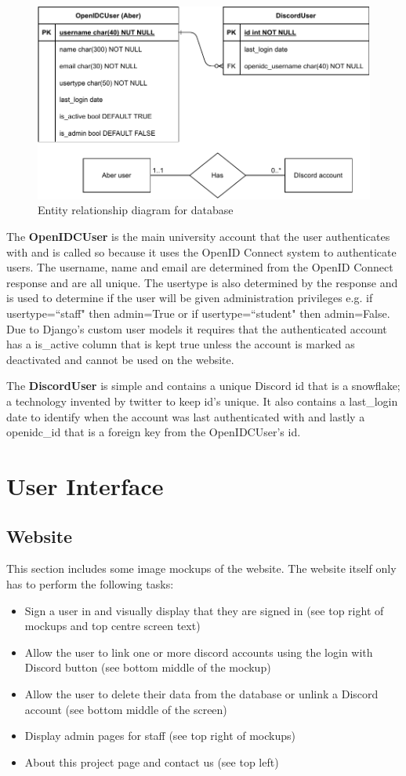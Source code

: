 \begin{figure}[H]
	\centering
	\includegraphics[width=0.8\linewidth]{Figures/database-er-0}
	\caption{Entity relationship diagram for database}
	\label{fig:database-er}
\end{figure}
The \textbf{OpenIDCUser} is the main university account that the user authenticates with and is called so because it uses the OpenID Connect \cite{OpenID} system to authenticate users. The username, name and email are determined from the OpenID Connect response and are all unique. The usertype is also determined by the response and is used to determine if the user will be given administration privileges e.g. if usertype=``staff" then admin=True or if usertype=``student" then admin=False. Due to Django's custom user models it requires that the authenticated account has a is\_active column that is kept true unless the account is marked as deactivated and cannot be used on the website.

The \textbf{DiscordUser} is simple and contains a unique Discord id that is a snowflake; a technology invented by twitter to keep id's unique. It also contains a last\_login date to identify when the account was last authenticated with and lastly a openidc\_id that is a foreign key from the OpenIDCUser's id.

\section{User Interface}\label{sec2:ui}

\subsection{Website}
This section includes some image mockups of the website. The website itself only has to perform the following tasks: 

\begin{itemize}
	\item Sign a user in and visually display that they are signed in (see top right of mockups and top centre screen text)
	\item Allow the user to link one or more discord accounts using the login with Discord button (see bottom middle of the mockup)
	\item Allow the user to delete their data from the database or unlink a Discord account (see bottom middle of the screen)
	\item Display admin pages for staff (see top right of mockups)
	\item About this project page and contact us (see top left)
\end{itemize}

